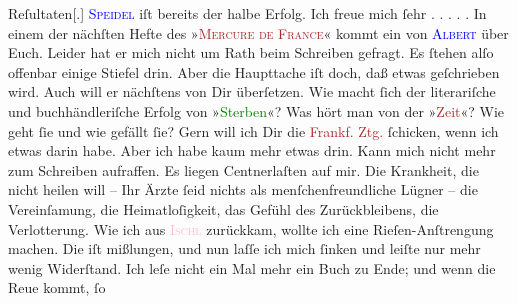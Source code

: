 \documentclass[twoside=false,titlepage=false,open=any, parskip=never, fontsize=12pt, headings=small, chapterprefix=false, appendixprefix=false]{scrbook}
\newcommand{\dotsfive}{%
.\kern\ellipsisgap 
.\kern\ellipsisgap
.\kern\ellipsisgap
.\kern\ellipsisgap 
.\kern\ellipsisgap 
\relax}
\newcommand{\pbposition}{\depth}
\newcommand{\pb}{\nobreak\hspace{0pt}\raisebox{-0.1em}{\raisebox{\pbposition}{\textnormal{|}}}\nobreak\hspace{0pt}}
\begin{document}
                  Reſultaten{[}.{]}{ }\textsc{\textcolor{blue}{Speidel}{}\ledrightnote{\textcolor{blue}{Ludwig Speidel}}} iſt bereits der
               halbe Erfolg. Ich freue mich ſehr{\dotsfive}\pend
           \pstart
           In einem der nächſten Hefte des »\textsc{\textcolor{brown}{Mercure de France}{}\ledrightnote{\textcolor{brown}{Mercure de France}}}« kommt ein \label{K_L02630-12v}\label{K_L02630-12h} von
                  \textsc{\textcolor{blue}{Albert}{}\ledrightnote{\textcolor{blue}{Henri Albert}}} über Euch.
               Leider hat er mich nicht um Rath {\pb}beim Schreiben
               gefragt. Es ſtehen alſo offenbar einige Stiefel drin. Aber die Haupttache iſt doch,
               daß etwas geſchrieben wird. Auch will er nächſtens \label{K_L02630-4v}\label{K_L02630-4h} von Dir überſetzen. Wie macht ſich der literariſche und
               buchhändleriſche Erfolg von »\textcolor{green}{Sterben}{}\ledrightnote{\textcolor{green}{Sterben. Novelle}}«?\pend
           \pstart
           Was hört man von der »\textcolor{brown}{Zeit}{}\ledrightnote{\textcolor{brown}{Die Zeit. Wiener Wochenschrift}}«? Wie geht ſie und wie
               gefällt ſie?\pend
           \pstart
           Gern will ich Dir die \textcolor{brown}{Frankf. Ztg.}{}\ledrightnote{\textcolor{brown}{Frankfurter Zeitung}} ſchicken, wenn
               ich etwas darin habe. Aber ich habe kaum mehr etwas drin. Kann {\pb}mich nicht mehr zum Schreiben aufraffen. Es liegen
               Centnerlaſten auf mir. Die Krankheit, die nicht heilen will – Ihr Ärzte ſeid nichts
               als menſchenfreundliche Lügner – die Vereinſamung, die Heimatloſigkeit, das Gefühl
               des Zurückbleibens, die Verlotterung. Wie ich aus \textsc{\textcolor{pink}{Ischl}{}\ledrightnote{\textcolor{pink}{Bad Ischl}}} zurückkam, wollte ich eine Rieſen-Anſtrengung
               machen. Die iſt mißlungen, und nun laſſe ich mich ſinken und leiſte nur mehr wenig
               Widerſtand. Ich leſe nicht ein Mal mehr ein Buch zu Ende; und wenn die Reue kommt, ſo
\end{document}
